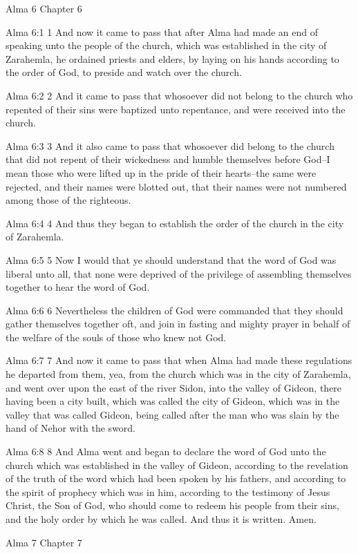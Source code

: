 Alma 6
Chapter 6

Alma 6:1
 1 And now it came to pass that after Alma had made an end of
speaking unto the people of the church, which was established in
the city of Zarahemla, he ordained priests and elders, by laying
on his hands according to the order of God, to preside and watch
over the church.

Alma 6:2
 2 And it came to pass that whosoever did not belong to the
church who repented of their sins were baptized unto repentance,
and were received into the church.

Alma 6:3
 3 And it also came to pass that whosoever did belong to the
church that did not repent of their wickedness and humble
themselves before God--I mean those who were lifted up in the
pride of their hearts--the same were rejected, and their names
were blotted out, that their names were not numbered among those
of the righteous.

Alma 6:4
 4 And thus they began to establish the order of the church in
the city of Zarahemla.

Alma 6:5
 5 Now I would that ye should understand that the word of God was
liberal unto all, that none were deprived of the privilege of
assembling themselves together to hear the word of God.

Alma 6:6
 6 Nevertheless the children of God were commanded that they
should gather themselves together oft, and join in fasting and
mighty prayer in behalf of the welfare of the souls of those who
knew not God.

Alma 6:7
 7 And now it came to pass that when Alma had made these
regulations he departed from them, yea, from the church which was
in the city of Zarahemla, and went over upon the east of the
river Sidon, into the valley of Gideon, there having been a city
built, which was called the city of Gideon, which was in the
valley that was called Gideon, being called after the man who was
slain by the hand of Nehor with the sword.

Alma 6:8
 8 And Alma went and began to declare the word of God unto the
church which was established in the valley of Gideon, according
to the revelation of the truth of the word which had been spoken
by his fathers, and according to the spirit of prophecy which was
in him, according to the testimony of Jesus Christ, the Son of
God, who should come to redeem his people from their sins, and
the holy order by which he was called. And thus it is written.
Amen.

Alma 7
Chapter 7

